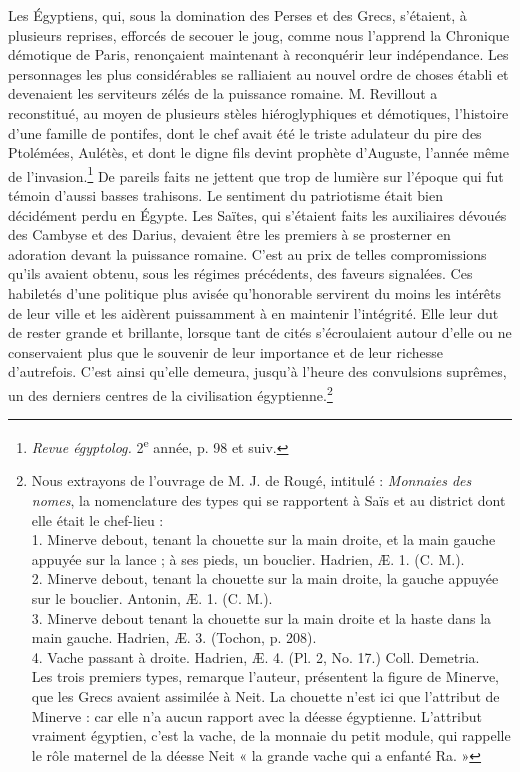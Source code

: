 \documentclass[letterpaper,twocolumn,openany,nodeprecatedcode]{dndbook}
\begin{document}
Les Égyptiens, qui, sous la domination des Perses et des Grecs, s'étaient, à plusieurs reprises, efforcés de secouer le joug, comme nous l'apprend la Chronique démotique de Paris, renonçaient maintenant à reconquérir leur indépendance. Les personnages les plus considérables se ralliaient au nouvel ordre de choses établi et devenaient les serviteurs zélés de la puissance romaine. M. Revillout a reconstitué, au moyen de plusieurs stèles hiéroglyphiques et démotiques, l'histoire d'une famille de pontifes, dont le chef avait été le triste adulateur du pire des Ptolémées, Aulétès, et dont le digne fils devint prophète d'Auguste, l'année même de l'invasion.\footnote{\emph{Revue égyptolog.} 2\textsuperscript{e} année, p. 98 et suiv.} De pareils faits ne jettent que trop de lumière sur l'époque qui fut témoin d'aussi basses trahisons. Le sentiment du patriotisme était bien décidément perdu en Égypte. Les Saïtes, qui s'étaient faits les auxiliaires dévoués des Cambyse et des Darius, devaient être les premiers à se prosterner en adoration devant la puissance romaine. C'est au prix de telles compromissions qu'ils avaient obtenu, sous les régimes précédents, des faveurs signalées. Ces habiletés d'une politique plus avisée qu'honorable servirent du moins les intérêts de leur ville et les aidèrent puissamment à en maintenir l'intégrité. Elle leur dut de rester grande et brillante, lorsque tant de cités s'écroulaient autour d'elle ou ne conservaient plus que le souvenir de leur importance et de leur richesse d'autrefois. C'est ainsi qu'elle demeura, jusqu'à l'heure des convulsions suprêmes, un des derniers centres de la civilisation égyptienne.\footnote{Nous extrayons de l'ouvrage de M. J. de Rougé, intitulé : \emph{Monnaies des nomes}, la nomenclature des types qui se rapportent à Saïs et au district dont elle était le chef-lieu :\\\hspace*{5mm}1. Minerve debout, tenant la chouette sur la main droite, et la main gauche appuyée sur la lance ; à ses pieds, un bouclier. Hadrien, Æ. 1. (C. M.).\\\hspace*{5mm}2. Minerve debout, tenant la chouette sur la main droite, la gauche appuyée sur le bouclier. Antonin, Æ. 1. (C. M.).\\\hspace*{5mm}3. Minerve debout tenant la chouette sur la main droite et la haste dans la main gauche. Hadrien, Æ. 3. (Tochon, p. 208).\\\hspace*{5mm}4. Vache passant à droite. Hadrien, Æ. 4. (Pl. 2, No. 17.) Coll. Demetria.\\\hspace*{5mm}Les trois premiers types, remarque l'auteur, présentent la figure de Minerve, que les Grecs avaient assimilée à Neit. La chouette n'est ici que l'attribut de Minerve : car elle n'a aucun rapport avec la déesse égyptienne. L'attribut vraiment égyptien, c'est la vache, de la monnaie du petit module, qui rappelle le rôle maternel de la déesse Neit « la grande vache qui a enfanté Ra. »}
\end{document}
